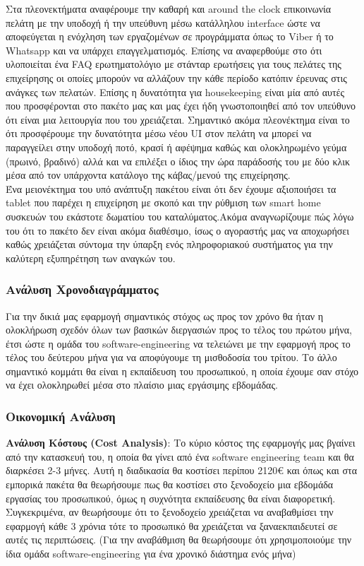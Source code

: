\noindent
Στα πλεονεκτήματα αναφέρουμε την καθαρή και around the clock επικοινωνία πελάτη με 
την υποδοχή ή την υπεύθυνη μέσω κατάλληλου interface ώστε να αποφεύγεται η 
ενόχληση των εργαζομένων σε προγράμματα όπως το Viber ή το Whatsapp και να υπάρχει 
επαγγελματισμός. Επίσης να αναφερθούμε στο ότι υλοποιείται ένα FAQ ερωτηματολόγιο με 
στάνταρ ερωτήσεις για τους πελάτες της επιχείρησης οι οποίες μπορούν να αλλάζουν την 
κάθε περίοδο κατόπιν έρευνας στις ανάγκες των πελατών. Επίσης η δυνατότητα για 
housekeeping είναι μία από αυτές που προσφέρονται στο πακέτο μας και μας έχει ήδη 
γνωστοποιηθεί από τον υπεύθυνο ότι είναι μια λειτουργία που του χρειάζεται. Σημαντικό 
ακόμα πλεονέκτημα είναι το ότι προσφέρουμε την δυνατότητα μέσω νέου UI στον πελάτη 
να μπορεί να παραγγείλει στην υποδοχή ποτό, κρασί ή αφέψημα καθώς και ολοκληρωμένο 
γεύμα (πρωινό, βραδινό) αλλά και να επιλέξει ο ίδιος την ώρα παράδοσής του με δύο κλικ 
μέσα από τον υπάρχοντα κατάλογο της κάβας/μενού της επιχείρησης. \\

\noindent
Ένα μειονέκτημα του υπό ανάπτυξη πακέτου είναι ότι δεν έχουμε αξιοποιήσει τα tablet που 
παρέχει η επιχείρηση με σκοπό και την ρύθμιση των smart home συσκευών του εκάστοτε 
δωματίου του καταλύματος.Ακόμα αναγνωρίζουμε πώς λόγω του ότι το πακέτο δεν είναι 
ακόμα διαθέσιμο, ίσως ο αγοραστής μας να αποχωρήσει καθώς χρειάζεται σύντομα την 
ύπαρξη ενός πληροφοριακού συστήματος για την καλύτερη εξυπηρέτηση των αναγκών του.

\subsubsection{Ανάλυση Χρονοδιαγράμματος}
Για την δικιά μας εφαρμογή σημαντικός στόχος ως προς τον χρόνο θα ήταν η ολοκλήρωση 
σχεδόν όλων των βασικών διεργασιών προς το τέλος του πρώτου μήνα, έτσι ώστε η ομάδα 
του software-engineering να τελειώνει με την εφαρμογή προς το τέλος του δεύτερου μήνα για 
να αποφύγουμε τη μισθοδοσία του τρίτου. Το άλλο σημαντικό κομμάτι θα είναι η εκπαίδευση 
του προσωπικού, η οποία έχουμε σαν στόχο να έχει ολοκληρωθεί μέσα στο πλαίσιο μιας 
εργάσιμης εβδομάδας.

\subsubsection{Οικονομική Ανάλυση}
\textbf{Ανάλυση Κόστους (Cost Analysis)}: Το κύριο κόστος της εφαρμογής μας βγαίνει από 
την κατασκευή του, η οποία θα γίνει από ένα software engineering team και θα διαρκέσει 
2-3 μήνες. Αυτή η διαδικασία θα κοστίσει περίπου 2120€ και όπως και στα εμπορικά πακέτα 
θα θεωρήσουμε πως θα κοστίσει στο ξενοδοχείο μια εβδομάδα εργασίας του προσωπικού, 
όμως η συχνότητα εκπαίδευσης θα είναι διαφορετική. Συγκεκριμένα, αν θεωρήσουμε ότι το 
ξενοδοχείο χρειάζεται να αναβαθμίσει την εφαρμογή κάθε 3 χρόνια τότε το προσωπικό θα 
χρειάζεται να ξαναεκπαιδευτεί σε αυτές τις περιπτώσεις. (Για την αναβάθμιση θα θεωρήσουμε 
ότι χρησιμοποιούμε την ίδια ομάδα software-engineering για ένα χρονικό διάστημα ενός μήνα)

